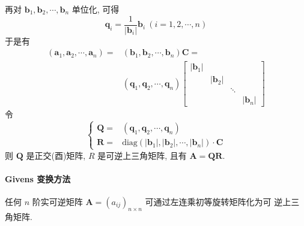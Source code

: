 再对 $\bm{b}_1, \bm{b}_2, \cdots, \bm{b}_n$ 单位化, 可得
$$
    \bm{q}_i = \dfrac{1}{\lvert \bm{b}_i \rvert}\bm{b}_i \ (i = 1,2,\cdots, n)
$$
于是有
\begin{align*}
    (\bm{a}_1, \bm{a}_2, \cdots, \bm{a}_n) = & (\bm{b}_1, \bm{b}_2, \cdots, \bm{b}_n)\bm{C} =                                                                           \\
                                             & (\bm{q}_1, \bm{q}_2, \cdots, \bm{q}_n) \begin{bmatrix}
                                                                                          \lvert \bm{b}_1 \rvert &                        &        &                        \\
                                                                                                                 & \lvert \bm{b}_2 \rvert &        &                        \\
                                                                                                                 &                        & \ddots &                        \\
                                                                                                                 &                        &        & \lvert \bm{b}_n \rvert
                                                                                      \end{bmatrix}
\end{align*}
令
$$
    \begin{cases}
        \bm{Q} = & (\bm{q}_1, \bm{q}_2, \cdots, \bm{q}_n)                                                                    \\
        \bm{R} = & \mathrm{diag}(\lvert \bm{b}_1 \rvert, \lvert \bm{b}_2\rvert, \cdots, \lvert \bm{b}_n \rvert) \cdot \bm{C}
    \end{cases}
$$
则 $\bm{Q}$ 是正交(酉)矩阵, $R$ 是可逆上三角矩阵, 且有 $\bm{A} = \bm{QR}$.

\paragraph[]{Givens 变换方法}

\par 任何 $n$ 阶实可逆矩阵 $\bm{A} = (a_{ij})_{n\times n}$ 可通过左连乘初等旋转矩阵化为可
逆上三角矩阵.


